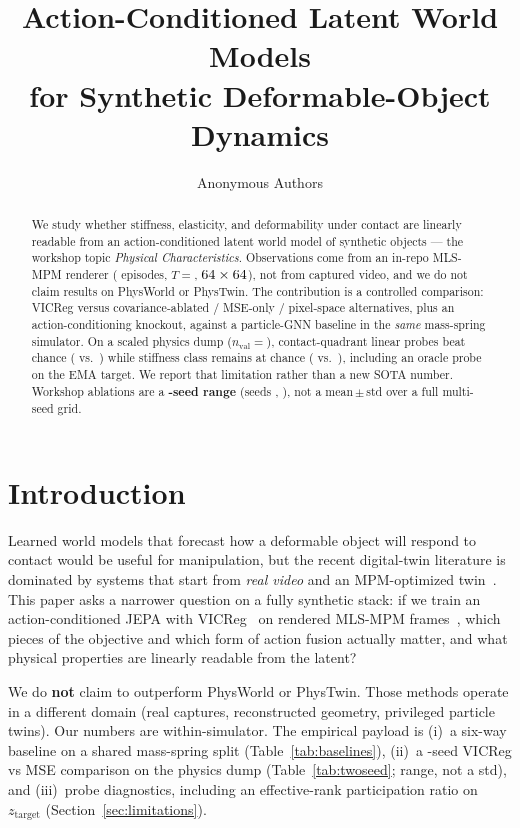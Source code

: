 \documentclass{article}
\title{Action-Conditioned Latent World Models\\
for Synthetic Deformable-Object Dynamics}
\author{Anonymous Authors}
\date{}
\begin{document}

\maketitle

\begin{abstract}
We study whether stiffness, elasticity, and deformability under contact are
linearly readable from an action-conditioned latent world model of synthetic
objects --- the workshop topic \emph{Physical Characteristics}. Observations
come from an in-repo MLS-MPM renderer (\NEpisodes{} episodes, $T{=}$\EpisodeLength{},
$64\times64$), not from captured video, and we do not claim results
on PhysWorld or PhysTwin. The contribution is a controlled comparison: VICReg
versus covariance-ablated / MSE-only / pixel-space alternatives, plus an
action-conditioning knockout, against a particle-GNN baseline in the
\emph{same} mass-spring simulator. On a scaled physics dump
($n_{\mathrm{val}}{=}$\NValPhysics{}), contact-quadrant linear probes beat chance
(\ProbeContactValMean{} vs.\ \ChanceContact{}) while stiffness class remains at
chance (\ProbeStiffValMean{} vs.\ \ChanceStiffness{}), including an oracle probe
on the EMA target. We report that limitation rather than a new SOTA number.
Workshop ablations are a \textbf{\NSeeds{}-seed range} (seeds \TrainSeedYaml{}, \SeedB{}), not a
mean\,$\pm$\,std over a full multi-seed grid.
\end{abstract}

\section{Introduction}
Learned world models that forecast how a deformable object will respond to
contact would be useful for manipulation, but the recent digital-twin literature
is dominated by systems that start from \emph{real video} and an MPM-optimized
twin~\citep{jiang2025phystwin,yang2025physworld}. This paper asks a narrower
question on a fully synthetic stack: if we train an action-conditioned JEPA
\citep{assran2023ijepa,bardes2024vjepa} with VICReg~\citep{bardes2022vicreg} on
rendered MLS-MPM frames~\citep{hu2018mlsmpm}, which pieces of the objective and
which form of action fusion actually matter, and what physical properties are
linearly readable from the latent?

We do \textbf{not} claim to outperform PhysWorld or PhysTwin. Those methods
operate in a different domain (real captures, reconstructed geometry, privileged
particle twins). Our numbers are within-simulator. The empirical payload is
(i)~a six-way baseline on a shared mass-spring split
(Table~\ref{tab:baselines}), (ii)~a \NSeeds{}-seed VICReg vs MSE comparison on the
physics dump (Table~\ref{tab:twoseed}; range, not a std),
and (iii)~probe diagnostics, including an effective-rank
participation ratio on $z_{\mathrm{target}}$
(Section~\ref{sec:limitations}).
\end{document}
